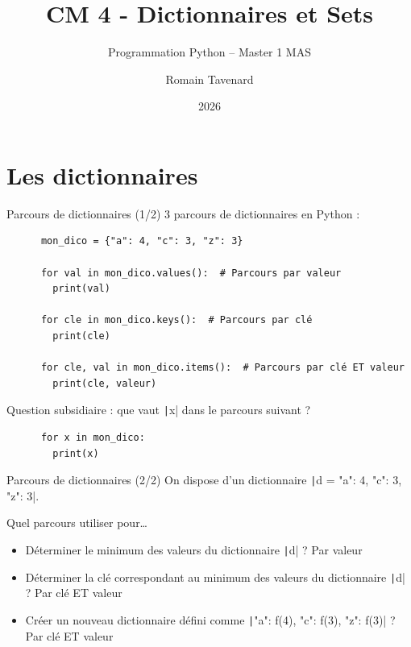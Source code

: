 \documentclass[10pt]{beamer}
\title[M1 MAS -- Python -- Dictionnaires]{CM 4 - Dictionnaires et Sets}
\subtitle{Programmation Python -- Master 1 MAS}
\author{Romain Tavenard}
\date{2026}
\institute{%
\hypersetup{urlcolor=.}
\makebox[2.2ex][c]{\faEnvelope}\enspace\href{mailto:romain.tavenard@univ-rennes2.fr}{\texttt{romain.tavenard@univ-rennes2.fr}}\\%
}
\begin{document}
\maketitle

\section{Les dictionnaires}

\begin{frame}[fragile]{Parcours de dictionnaires (1/2)}  
  3 parcours de dictionnaires en Python :

  \begin{beamercodeblock}
    \begin{verbatim}
      mon_dico = {"a": 4, "c": 3, "z": 3}

      for val in mon_dico.values():  # Parcours par valeur
        print(val)

      for cle in mon_dico.keys():  # Parcours par clé
        print(cle)
      
      for cle, val in mon_dico.items():  # Parcours par clé ET valeur
        print(cle, valeur)
    \end{verbatim}
  \end{beamercodeblock}

  \pause

  Question subsidiaire : que vaut \texttt|x| dans le parcours suivant ?

  \begin{beamercodeblock}
    \begin{verbatim}
      for x in mon_dico:
        print(x)
    \end{verbatim}
  \end{beamercodeblock}
\end{frame}

\begin{frame}[fragile]{Parcours de dictionnaires (2/2)}  
  On dispose d'un dictionnaire \texttt|d = {"a": 4, "c": 3, "z": 3}|.

  Quel parcours utiliser pour\dots

  \begin{itemize}
    \item Déterminer le minimum des valeurs du dictionnaire \texttt|d| ? \pause \alert{Par valeur}
    \item Déterminer la clé correspondant au minimum des valeurs du dictionnaire \texttt|d| ? \pause \alert{Par clé ET valeur}
    \item Créer un nouveau dictionnaire défini comme \texttt|{"a": f(4), "c": f(3), "z": f(3)}| ? \pause \alert{Par clé ET valeur}
  \end{itemize}
\end{frame}
\end{document}
